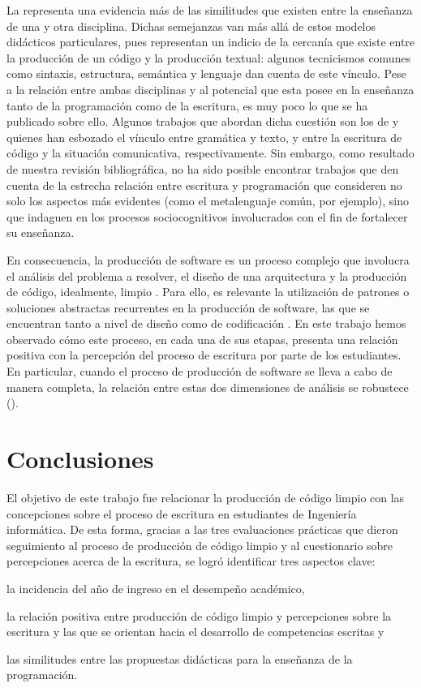 \documentclass[spanish]{textolivre}
\begin{document}
La  representa una evidencia más de las similitudes que existen entre la enseñanza de una y otra disciplina. Dichas semejanzas van más allá de estos modelos didácticos particulares, pues representan un indicio de la cercanía que existe entre la producción de un código y la producción textual: algunos tecnicismos comunes como sintaxis, estructura, semántica y lenguaje dan cuenta de este vínculo. 
Pese a la relación entre ambas disciplinas y al potencial que esta posee en la enseñanza tanto de la programación como de la escritura, es muy poco lo que se ha publicado sobre ello. Algunos trabajos que abordan dicha cuestión son los de \textcite{santos2020javardise} y \textcite{lindgren2021writing} quienes han esbozado el vínculo entre gramática y texto, y entre la escritura de código y la situación comunicativa, respectivamente. Sin embargo, como resultado de nuestra revisión bibliográfica, no ha sido posible encontrar trabajos que den cuenta de la estrecha relación entre escritura y programación que consideren no solo los aspectos más evidentes (como el metalenguaje común, por ejemplo), sino que indaguen en los procesos sociocognitivos involucrados con el fin de fortalecer su enseñanza.


En consecuencia, la producción de software es un proceso complejo que involucra el análisis del problema a resolver, el diseño de una arquitectura y la producción de código, idealmente, limpio \cite{sommerville2020engineering}. Para ello, es relevante la utilización de patrones o soluciones abstractas recurrentes en la producción de software, las que se encuentran tanto a nivel de diseño como de codificación \cite{wedyan2020impact}. En este trabajo hemos observado cómo este proceso, en cada una de sus etapas, presenta una relación positiva con la percepción del proceso de escritura por parte de los estudiantes. En particular, cuando el proceso de producción de software se lleva a cabo de manera completa, la relación entre estas dos dimensiones de análisis se robustece ().

\section{Conclusiones}

El objetivo de este trabajo fue relacionar la producción de código limpio con las concepciones sobre el proceso de escritura en estudiantes de Ingeniería informática. De esta forma, gracias a las tres evaluaciones prácticas que dieron seguimiento al proceso de producción de código limpio y al cuestionario sobre percepciones acerca de la escritura, se logró identificar tres aspectos clave:
\begin{enumerate*}[label=\arabic*)]
    \item la incidencia del año de ingreso en el desempeño académico,
    \item la relación positiva entre producción de código limpio y percepciones sobre la escritura y las que se orientan hacia el desarrollo de competencias escritas y
    \item las similitudes entre las propuestas didácticas para la enseñanza de la programación. 
\end{enumerate*}
\end{document}

